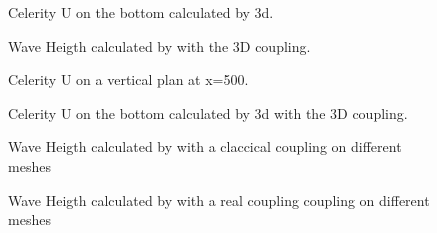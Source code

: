 \begin{figure} [!h]
\centering
{}
\caption{Celerity U on the bottom calculated by \telemac3d.}
\label{figres3Dcoupl3}
\end{figure}

\begin{figure} [!h]
\centering
{}
\caption{Wave Heigth calculated by \tomawac with the 3D coupling.}
\label{figres3Dcoupl4}
\end{figure}

\begin{figure} [!h]
\centering
{}
\caption{Celerity U on a vertical plan at x=500.}
\label{figres3Dcoupl5}
\end{figure}

\begin{figure} [!h]
\centering
{}
\caption{Celerity U on the bottom calculated by \telemac3d with the 3D
  coupling.}
\label{figres3Dcoupl6}
\end{figure}


\begin{figure} [!h]
\centering
{}
 \caption{Wave Heigth calculated by \tomawac with a claccical coupling on different meshes }
\label{figres3Dcoupl7}
\end{figure}

\begin{figure} [!h]
\centering
{}
 \caption{Wave Heigth calculated by \tomawac with a real coupling coupling on different meshes }
\label{figres3Dcoupl8}
\end{figure}
